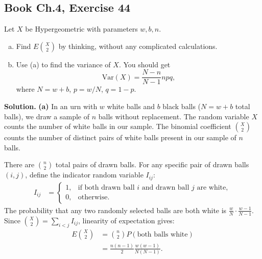\documentclass[11pt,a4paper]{article}
\begin{document}
\vspace{10pt}
\subsection{Book Ch.4, Exercise 44}
\begin{tcolorbox}[title={Book Ch.4, Exercise 44}]
Let $X$ be Hypergeometric with parameters $w, b, n$.
\begin{enumerate}[(a)]
\item Find $E\binom{X}{2}$ by thinking, without any complicated calculations.
\item Use (a) to find the variance of $X$. You should get
\[
\text{Var}(X) = \frac{N-n}{N-1} n p q,
\]
where $N = w + b$, $p = w/N$, $q = 1 - p$.
\end{enumerate}
\end{tcolorbox}

\noindent \textbf{Solution.} \textbf{(a)} In an urn with $w$ white balls and $b$ black balls ($N = w + b$ total balls), we draw a sample of $n$ balls without replacement. The random variable $X$ counts the number of white balls in our sample. The binomial coefficient $\binom{X}{2}$ counts the number of distinct pairs of white balls present in our sample of $n$ balls.

There are $\binom{n}{2}$ total pairs of drawn balls. For any specific pair of drawn balls $(i, j)$, define the indicator random variable $I_{ij}$:
\begin{align*}
I_{ij} &= \begin{cases}
1, & \text{if both drawn ball } i \text{ and drawn ball } j \text{ are white}, \\
0, & \text{otherwise}.
\end{cases}
\end{align*}
The probability that any two randomly selected balls are both white is $\frac{w}{N} \cdot \frac{w-1}{N-1}$. Since $\binom{X}{2} = \sum_{i < j} I_{ij}$, linearity of expectation gives:
\begin{align*}
E\binom{X}{2} &= \binom{n}{2} P(\text{both balls white}) \\
&= \frac{n(n-1)}{2} \frac{w(w-1)}{N(N-1)}.
\end{align*}
\end{document}
